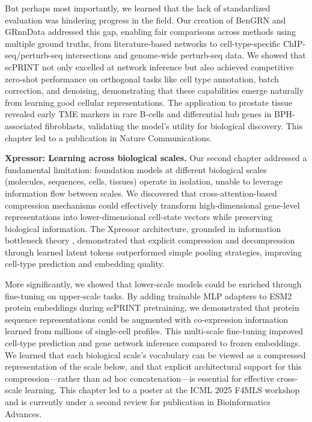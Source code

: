 But perhaps most importantly, we learned that the lack of standardized evaluation was hindering progress in the field. Our creation of BenGRN and GRnnData addressed this gap, enabling fair comparisons across methods using multiple ground truths, from literature-based networks to cell-type-specific \gls{ChIP-seq}/perturb-seq intersections and genome-wide perturb-seq data. \cite{dixitPerturbseqDissectingMolecular2016} We showed that \gls{scPRINT} not only excelled at network inference but also achieved competitive zero-shot performance on orthogonal tasks like cell type annotation, batch correction, and denoising, demonstrating that these capabilities emerge naturally from learning good cellular representations. The application to prostate tissue revealed early \gls{TME} markers in rare B-cells and differential hub genes in \gls{BPH}-associated fibroblasts, validating the model's utility for biological discovery. This chapter led to a publication in Nature Communications.

\textbf{Xpressor: Learning across biological scales.} Our second chapter addressed a fundamental limitation: foundation models at different biological scales (molecules, sequences, cells, tissues) operate in isolation, unable to leverage information flow between scales. We discovered that cross-attention-based compression mechanisms could effectively transform high-dimensional gene-level representations into lower-dimensional cell-state vectors while preserving biological information. The Xpressor architecture, grounded in information bottleneck theory \cite{chechikInformationBottleneckGaussian}, demonstrated that explicit compression and decompression through learned latent tokens outperformed simple pooling strategies, improving cell-type prediction and embedding quality.

More significantly, we showed that lower-scale models could be enriched through fine-tuning on upper-scale tasks. By adding trainable \gls{MLP} adapters to \gls{ESM}2 protein embeddings during \gls{scPRINT} pretraining, we demonstrated that protein sequence representations could be augmented with co-expression information learned from millions of single-cell profiles. This multi-scale fine-tuning improved cell-type prediction and gene network inference compared to frozen embeddings. We learned that each biological scale's vocabulary can be viewed as a compressed representation of the scale below, and that explicit architectural support for this compression---rather than ad hoc concatenation---is essential for effective cross-scale learning. This chapter led to a poster at the ICML 2025 F4MLS workshop and is currently under a second review for publication in Bioinformatics Advances.

